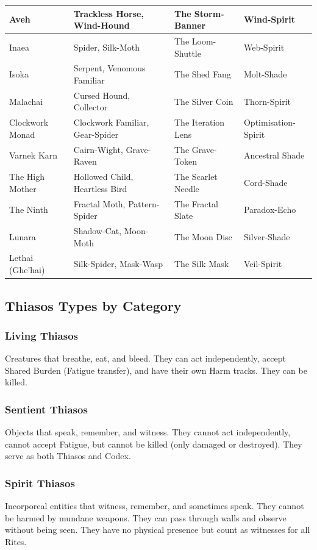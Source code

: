\begin{table}[h]
\begin{tabular}{llll}
Aveh & Trackless Horse, Wind-Hound & The Storm-Banner & Wind-Spirit \\
\hline
Inaea & Spider, Silk-Moth & The Loom-Shuttle & Web-Spirit \\
Isoka & Serpent, Venomous Familiar & The Shed Fang & Molt-Shade \\
Malachai & Cursed Hound, Collector & The Silver Coin & Thorn-Spirit \\
\hline
Clockwork Monad & Clockwork Familiar, Gear-Spider & The Iteration Lens & Optimisation-Spirit \\
\hline
Varnek Karn & Cairn-Wight, Grave-Raven & The Grave-Token & Ancestral Shade \\
The High Mother & Hollowed Child, Heartless Bird & The Scarlet Needle & Cord-Shade \\
\hline
The Ninth & Fractal Moth, Pattern-Spider & The Fractal Slate & Paradox-Echo \\
Lunara & Shadow-Cat, Moon-Moth & The Moon Disc & Silver-Shade \\
\hline
Lethai (Ghe'hai) & Silk-Spider, Mask-Wasp & The Silk Mask & Veil-Spirit \\
\hline
\end{tabular}
\end{table}

\subsection*{Thiasos Types by Category}

\subsubsection*{Living Thiasos}
Creatures that breathe, eat, and bleed. They can act independently, accept Shared Burden (Fatigue transfer), and have their own Harm tracks. They can be killed.

\subsubsection*{Sentient Thiasos}
Objects that speak, remember, and witness. They cannot act independently, cannot accept Fatigue, but cannot be killed (only damaged or destroyed). They serve as both Thiasos and Codex.

\subsubsection*{Spirit Thiasos}
Incorporeal entities that witness, remember, and sometimes speak. They cannot be harmed by mundane weapons. They can pass through walls and observe without being seen. They have no physical presence but count as witnesses for all Rites.

